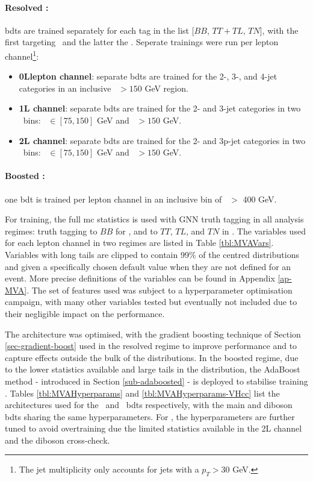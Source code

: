 \paragraph{Resolved \boldvhbc:} \gls{bdt}s are trained separately for each tag in the list [$BB$, $TT+TL$, $TN$], with the first targeting \vhb\ and the latter the \vhc. Seperate trainings were run per lepton channel\footnote{The jet multiplicity only accounts for jets with a $p_T > 30$ GeV.}:
\begin{itemize}
    \item \textbf{0Llepton channel}: separate \gls{bdt}s are trained for the 2-, 3-, and 4-jet categories in an inclusive \ptv\ $> 150$ GeV region.
    \item \textbf{1L channel}: separate \gls{bdt}s are trained for the 2- and 3-jet categories in two \ptv\ bins: \ptv\ $\in [75, 150]$ GeV and \ptv\ $> 150$ GeV.
    \item \textbf{2L channel}: separate \gls{bdt}s are trained for the 2- and 3p-jet categories in two \ptv\ bins: \ptv\ $\in [75, 150]$ GeV and \ptv\ $> 150$ GeV.
\end{itemize}
\paragraph{Boosted \vhb:} one \gls{bdt} is trained per lepton channel in an inclusive bin of \ptv\ $>$ 400 GeV.

For training, the full \gls{mc} statistics is used with GNN truth tagging in all analysis regimes: truth tagging to $BB$ for \vhb, and to $TT$, $TL$, and $TN$ in \vhc. The variables used for each lepton channel in two regimes are listed in Table \ref{tbl:MVAVars}. Variables with long tails are clipped to contain 99\% of the centred distributions and given a specifically chosen default value when they are not defined for an event. More precise definitions of the variables can be found in Appendix \ref{ap-MVA}. The set of features used was subject to a hyperparameter optimisation campaign, with many other variables tested but eventually not included due to their negligible impact on the performance. 



The architecture was optimised, with the gradient boosting technique of Section \ref{sec-gradient-boost} used in the resolved regime to improve performance and to capture effects outside the bulk of the distributions. In the boosted regime, due to the lower statistics available and large tails in the distribution, the AdaBoost method - introduced in Section \ref{sub-adaboosted} - is deployed to stabilise training \cite{Adaboost}. Tables \ref{tbl:MVAHyperparams} and \ref{tbl:MVAHyperparams-VHcc} list the architectures used for the \vhb\ and \vhc\ \gls{bdt}s respectively, with the main and diboson \gls{bdt}s sharing the same hyperparameters. For \vhc, the hyperparameters are further tuned to avoid overtraining due the limited statistics available in the 2L channel and the diboson cross-check.

